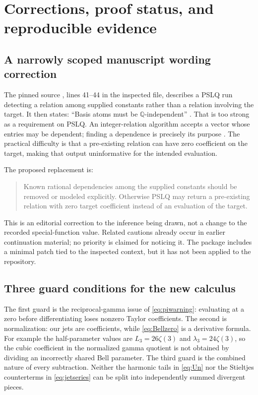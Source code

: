\section{Corrections, proof status, and reproducible evidence}\label{sec:audit}

\subsection{A narrowly scoped manuscript wording correction}
The pinned source , lines 41--44 in the
inspected file, describes a PSLQ run detecting a relation among supplied
constants rather than a relation involving the target.  It then states:
``Basis atoms must be $\mathbb Q$-independent'' \cite{repo-integration}.
That is too strong as a requirement on PSLQ.  An integer-relation algorithm
accepts a vector whose entries may be dependent; finding a dependence is
precisely its purpose \cite{pslq}.  The practical difficulty is that a
pre-existing relation can have zero coefficient on the target, making that
output uninformative for the intended evaluation.

The proposed replacement is:
\begin{quote}
Known rational dependencies among the supplied constants should be removed
or modeled explicitly.  Otherwise PSLQ may return a pre-existing relation
with zero target coefficient instead of an evaluation of the target.
\end{quote}
This is an editorial correction to the inference being drawn, not a change
to the recorded special-function value.  Related cautions already occur
in earlier continuation material; no priority is claimed for noticing it.
The package includes a minimal patch tied to the inspected context, but it
has not been applied to the repository.

\subsection{Three guard conditions for the new calculus}
The first guard is the reciprocal-gamma issue of
\eqref{eq:piwarning}: evaluating at a zero before differentiating loses
nonzero Taylor coefficients.  The second is normalization: our jets are
coefficients, while \eqref{eq:Bellzero} is a derivative formula.  For
example the half-parameter values are $L_3=26\zeta(3)$ and
$\lambda_3=24\zeta(3)$, so the cubic coefficient in the normalized gamma
quotient is not obtained by dividing an incorrectly shared Bell parameter.
The third guard is the combined nature of every subtraction.  Neither
the harmonic tails in \eqref{eq:Un} nor the Stieltjes counterterms in
\eqref{eq:jetseries} can be split into independently summed divergent
pieces.


